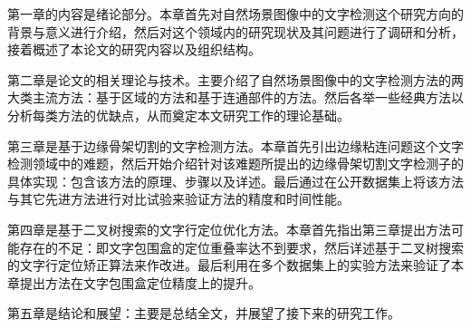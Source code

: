    第一章的内容是绪论部分。本章首先对自然场景图像中的文字检测这个研究方向的背景与意义进行介绍，然后对这个领域内的研究现状及其问题进行了调研和分析，接着概述了本论文的研究内容以及组织结构。

    第二章是论文的相关理论与技术。主要介绍了自然场景图像中的文字检测方法的两大类主流方法：基于区域的方法和基于连通部件的方法。然后各举一些经典方法以分析每类方法的优缺点，从而奠定本文研究工作的理论基础。

    第三章是基于边缘骨架切割的文字检测方法。本章首先引出边缘粘连问题这个文字检测领域中的难题，然后开始介绍针对该难题所提出的边缘骨架切割文字检测子的具体实现：包含该方法的原理、步骤以及详述。最后通过在公开数据集上将该方法与其它先进方法进行对比试验来验证方法的精度和时间性能。

    第四章是基于二叉树搜索的文字行定位优化方法。本章首先指出第三章提出方法可能存在的不足：即文字包围盒的定位重叠率达不到要求，然后详述基于二叉树搜索的文字行定位矫正算法来作改进。最后利用在多个数据集上的实验方法来验证了本章提出方法在文字包围盒定位精度上的提升。

    第五章是结论和展望：主要是总结全文，并展望了接下来的研究工作。



